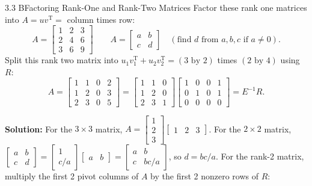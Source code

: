 \documentclass[11pt,a4paper,openany,oneside]{book}
\def\vect#1{#1}%
\def\mathbf#1{#1}%
\newcommand{\vect}[1]{\mathbf{#1}}
\newcommand{\T}{\mathrm{T}}
\numberwithin{equation}{chapter}
\begin{document}
\begin{example}{3.3 B}{Factoring Rank-One and Rank-Two Matrices}
Factor these rank one matrices into $A = \vect{u}\vect{v}^\T =$ column times row:
\[
A = \begin{bmatrix} 1 & 2 & 3 \\ 2 & 4 & 6 \\ 3 & 6 & 9 \end{bmatrix} \qquad A = \begin{bmatrix} a & b \\ c & d \end{bmatrix} \quad (\text{find } d \text{ from } a, b, c \text{ if } a \neq 0).
\]
Split this rank two matrix into $\vect{u}_1\vect{v}_1^\T + \vect{u}_2\vect{v}_2^\T = (3 \text{ by } 2)$ times $(2 \text{ by } 4)$ using $R$:
\[
A = \begin{bmatrix} 1 & 1 & 0 & 2 \\ 1 & 2 & 0 & 3 \\ 2 & 3 & 0 & 5 \end{bmatrix} = \begin{bmatrix} 1 & 1 & 0 \\ 1 & 2 & 0 \\ 2 & 3 & 1 \end{bmatrix} \begin{bmatrix} 1 & 0 & 0 & 1 \\ 0 & 1 & 0 & 1 \\ 0 & 0 & 0 & 0 \end{bmatrix} = E^{-1}R.
\]
\end{example}
\textbf{Solution:} For the $3\times 3$ matrix, $A = \begin{bmatrix}1\\2\\3\end{bmatrix}\begin{bmatrix}1 & 2 & 3\end{bmatrix}$. For the $2\times 2$ matrix, $\begin{bmatrix}a & b\\c & d\end{bmatrix} = \begin{bmatrix}1\\c/a\end{bmatrix}\begin{bmatrix}a & b\end{bmatrix} = \begin{bmatrix}a & b\\c & bc/a\end{bmatrix}$, so $d = bc/a$. For the rank-2 matrix, multiply the first 2 pivot columns of $A$ by the first 2 nonzero rows of $R$:
\end{document}

